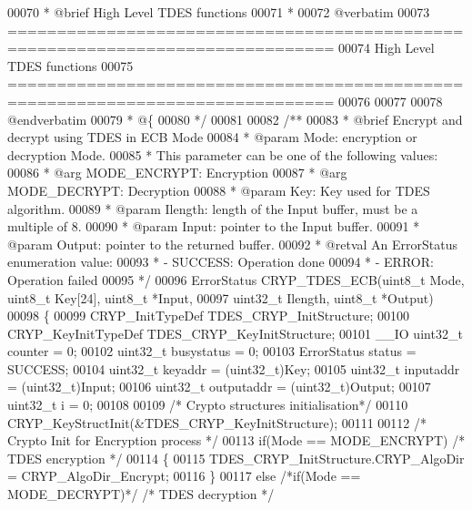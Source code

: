 \begin{DoxyCode}
00070 \textcolor{comment}{ *  @brief   High Level TDES functions }
00071 \textcolor{comment}{ *}
00072 \textcolor{comment}{@verbatim   }
00073 \textcolor{comment}{ ===============================================================================}
00074 \textcolor{comment}{                          High Level TDES functions}
00075 \textcolor{comment}{ ===============================================================================}
00076 \textcolor{comment}{}
00077 \textcolor{comment}{}
00078 \textcolor{comment}{@endverbatim}
00079 \textcolor{comment}{  * @\{}
00080 \textcolor{comment}{  */}
00081 
00082 \textcolor{comment}{/**}
00083 \textcolor{comment}{  * @brief  Encrypt and decrypt using TDES in ECB Mode}
00084 \textcolor{comment}{  * @param  Mode: encryption or decryption Mode.}
00085 \textcolor{comment}{  *           This parameter can be one of the following values:}
00086 \textcolor{comment}{  *            @arg MODE\_ENCRYPT: Encryption}
00087 \textcolor{comment}{  *            @arg MODE\_DECRYPT: Decryption}
00088 \textcolor{comment}{  * @param  Key: Key used for TDES algorithm.}
00089 \textcolor{comment}{  * @param  Ilength: length of the Input buffer, must be a multiple of 8.}
00090 \textcolor{comment}{  * @param  Input: pointer to the Input buffer.}
00091 \textcolor{comment}{  * @param  Output: pointer to the returned buffer.}
00092 \textcolor{comment}{  * @retval An ErrorStatus enumeration value:}
00093 \textcolor{comment}{  *          - SUCCESS: Operation done}
00094 \textcolor{comment}{  *          - ERROR: Operation failed}
00095 \textcolor{comment}{  */}
00096 ErrorStatus CRYP_TDES_ECB(uint8\_t Mode, uint8\_t Key[24], uint8\_t *Input,
00097                           uint32\_t Ilength, uint8\_t *Output)
00098 \{
00099   CRYP\_InitTypeDef TDES\_CRYP\_InitStructure;
00100   CRYP\_KeyInitTypeDef TDES\_CRYP\_KeyInitStructure;
00101   \_\_IO uint32\_t counter = 0;
00102   uint32\_t busystatus = 0;
00103   ErrorStatus status = SUCCESS;
00104   uint32\_t keyaddr    = (uint32\_t)Key;
00105   uint32\_t inputaddr  = (uint32\_t)Input;
00106   uint32\_t outputaddr = (uint32\_t)Output;
00107   uint32\_t i = 0;
00108 
00109   \textcolor{comment}{/* Crypto structures initialisation*/}
00110   CRYP_KeyStructInit(&TDES\_CRYP\_KeyInitStructure);
00111 
00112   \textcolor{comment}{/* Crypto Init for Encryption process */}
00113   \textcolor{keywordflow}{if}(Mode == MODE_ENCRYPT) \textcolor{comment}{/* TDES encryption */}
00114   \{
00115      TDES\_CRYP\_InitStructure.CRYP_AlgoDir = CRYP_AlgoDir_Encrypt;
00116   \}
00117   \textcolor{keywordflow}{else} \textcolor{comment}{/*if(Mode == MODE\_DECRYPT)*/} \textcolor{comment}{/* TDES decryption */}

\end{DoxyCode}
